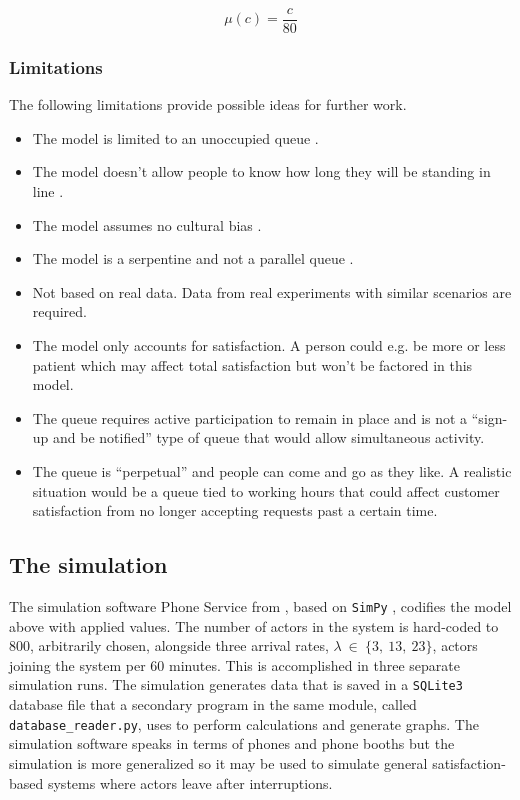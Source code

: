 \documentclass[conference]{IEEEtran}
\begin{document}
\begin{equation}
    \mu(c) = \frac{c}{80}
    \label{eq:service-rate}
\end{equation}

\subsubsection{Limitations}

The following limitations provide possible ideas for further work.

\begin{itemize}
    \item The model is limited to an unoccupied queue
        \cite{NeuroLaunchMakingSomeoneWait}.
    \item The model doesn't allow people to know how long they
        will be standing in line
        \cite{NeuroLaunchMakingSomeoneWait}.
    \item The model assumes no cultural bias
        \cite{NeuroLaunchMakingSomeoneWait}.
    \item The model is a serpentine and not a parallel queue
        \cite{NeuroLaunchMakingSomeoneWait}.
    \item Not based on real data. Data from real experiments with
        similar scenarios are required.
    \item The model only accounts for satisfaction. A person
        could e.g. be more or less patient which may affect total
        satisfaction but won't be factored in this model.
    \item The queue requires active participation to remain in
        place and is not a ``sign-up and be notified'' type of
        queue that would allow simultaneous activity.
    \item The queue is ``perpetual'' and people can come and go
        as they like. A realistic situation would be a queue tied
        to working hours that could affect customer satisfaction
        from no longer accepting requests past a certain time.
\end{itemize}

\subsection{The simulation}

The simulation software Phone Service from
\cite{AvekvistLorentzonDta400}, based on \verb|SimPy| \cite{SimPy},
codifies the model above with applied values. The number of actors
in the system is hard-coded to $800$, arbitrarily chosen, alongside
three arrival rates, $\lambda~\in~\{3,~13,~23\}$, actors joining
the system per $60$ minutes. This is accomplished in three separate
simulation runs. The simulation generates data that is saved in a
\verb|SQLite3| \cite{SQLite3} database file that a secondary
program in the same module, called \verb|database_reader.py|, uses
to perform calculations and generate graphs. The simulation
software speaks in terms of phones and phone booths but the
simulation is more generalized so it may be used to simulate
general satisfaction-based systems where actors leave after
interruptions.
\end{document}
